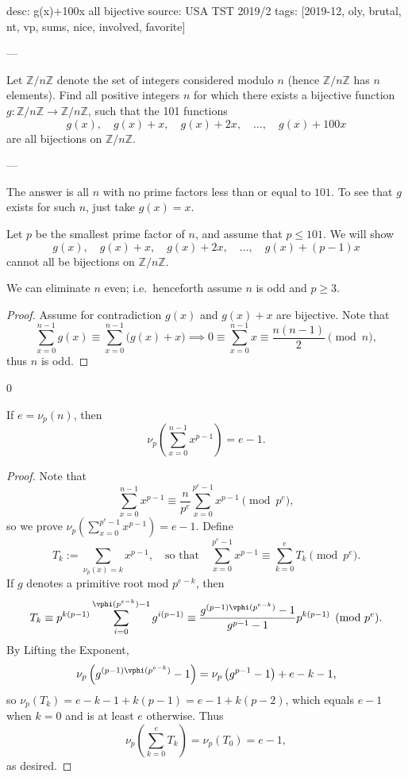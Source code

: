 desc: g(x)+100x all bijective
source: USA TST 2019/2
tags: [2019-12, oly, brutal, nt, vp, sums, nice, involved, favorite]

---

Let $\mathbb Z/n\mathbb Z$ denote the set of integers considered modulo $n$ (hence $\mathbb Z/n\mathbb Z$ has $n$ elements). Find all positive integers $n$ for which there exists a bijective function $g:\mathbb Z/n\mathbb Z\to\mathbb Z/n\mathbb Z$, such that the 101 functions \[g(x),\quad g(x)+x,\quad g(x)+2x,\quad\ldots,\quad g(x)+100x\]
are all bijections on $\mathbb Z/n\mathbb Z$.

---

The answer is all $n$ with no prime factors less than or equal to $101$. To see that $g$ exists for such $n$, just take $g(x)=x$.

Let $p$ be the smallest prime factor of $n$, and assume that $p\le101$. We will show \[g(x),\quad g(x)+x,\quad g(x)+2x,\quad\ldots,\quad g(x)+(p-1)x\]
cannot all be bijections on $\mathbb Z/n\mathbb Z$.
\begin{claim*}
    We can eliminate $n$ even; i.e.\ henceforth assume $n$ is odd and $p\ge3$.
\end{claim*}
\begin{proof}
    Assume for contradiction $g(x)$ and $g(x)+x$ are bijective. Note that \[\sum_{x=0}^{n-1}g(x)\equiv\sum_{x=0}^{n-1}\Big(g(x)+x\Big)\implies0\equiv\sum_{x=0}^{n-1}x\equiv\frac{n(n-1)}2\pmod n,\]
    thus $n$ is odd.
\end{proof}
\setcounter{lemma}0
\begin{lemma}
    If $e=\nu_p(n)$, then \[\nu_p\left(\sum_{x=0}^{n-1}x^{p-1}\right)=e-1.\]
\end{lemma}
\begin{proof}
    Note that \[\sum_{x=0}^{n-1}x^{p-1}\equiv\frac n{p^e}\sum_{x=0}^{p^e-1}x^{p-1}\pmod{p^e},\]
    so we prove $\nu_p\left(\sum_{x=0}^{p^e-1}x^{p-1}\right)=e-1$. Define \[T_k:=\sum_{\nu_p(x)=k}x^{p-1},\quad\text{so that}\quad\sum_{x=0}^{p^e-1}x^{p-1}\equiv\sum_{k=0}^eT_k\pmod{p^e}.\]
    If $g$ denotes a primitive root mod $p^{e-k}$, then \[T_k\equiv p^{k(p-1)}\sum_{i=0}^{\vphi(p^{e-k})-1}g^{i(p-1)}\equiv\frac{g^{(p-1)\vphi(p^{e-k})}-1}{g^{p-1}-1}p^{k(p-1)}\pmod{p^e}.\]
    By Lifting the Exponent, \[\nu_p\left(g^{(p-1)\vphi(p^{e-k})}-1\right)=\nu_p\left(g^{p-1}-1\right)+e-k-1,\]
    so $\nu_p(T_k)=e-k-1+k(p-1)=e-1+k(p-2)$, which equals $e-1$ when $k=0$ and is at least $e$ otherwise. Thus \[\nu_p\left(\sum_{k=0}^eT_k\right)=\nu_p(T_0)=e-1,\]
    as desired.
\end{proof}
